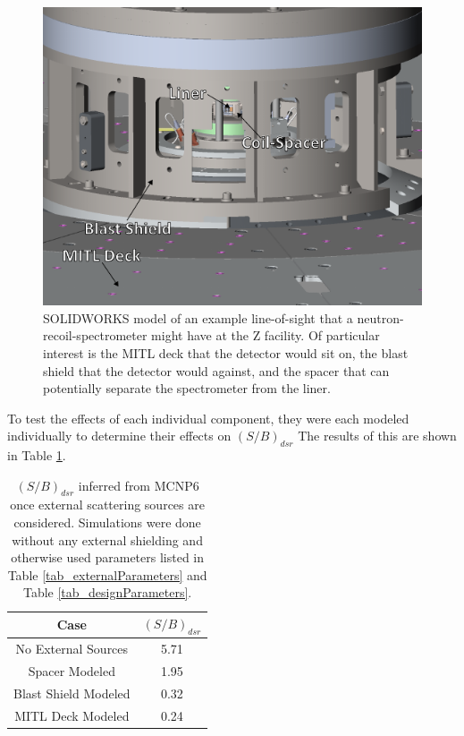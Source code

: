 \begin{figure}[h!]
	
	\centering
	\includegraphics[scale=1.5]{Figures/z_los.pdf}
	\caption{SOLIDWORKS model of an example line-of-sight that a neutron-recoil-spectrometer might have at the Z facility. Of particular interest is the MITL deck that the detector would sit on, the blast shield that the detector would against, and the spacer that can potentially separate the spectrometer from the liner.}
	\label{fig_z_los}
	
\end{figure}



To test the effects of each individual component, they were each modeled individually to determine their effects on $(S/B)_{dsr}$ The results of this are shown in Table \ref{tab_externalS2B}.

\begin{table}[!h]
	\caption{ $(S/B)_{dsr}$ inferred from MCNP6 once external scattering sources are considered. Simulations were done without any external shielding and otherwise used parameters listed in Table \ref{tab_externalParameters} and Table \ref{tab_designParameters}. }
	\label{tab_externalS2B}
	\renewcommand{\arraystretch}{1.5}
	\centering
	\begin{tabular}{  c | c  }
		Case & $(S/B)_{dsr}$ \\\hline
		No External Sources & 5.71 \\
		Spacer Modeled & 1.95 \\
		Blast Shield Modeled	& 0.32 \\
		MITL Deck Modeled	& 0.24
	\end{tabular}		
\end{table}

